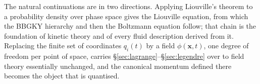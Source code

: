 \documentclass[12pt]{article}
\renewcommand{\vec}[1]{\bm{#1}}
\begin{document}
The natural continuations are in two directions.  Applying
Liouville's theorem to a probability density over phase space gives the
Liouville equation, from which the BBGKY hierarchy and then the
Boltzmann equation follow; that chain is the foundation of kinetic
theory and of every fluid description derived from it.  Replacing the
finite set of coordinates $q_i(t)$ by a field $\phi(\vec x,t)$, one
degree of freedom per point of space, carries
\S\ref{sec:lagrange}--\S\ref{sec:legendre} over to field theory
essentially unchanged, and the canonical momentum defined there becomes
the object that is quantised.
\end{document}
